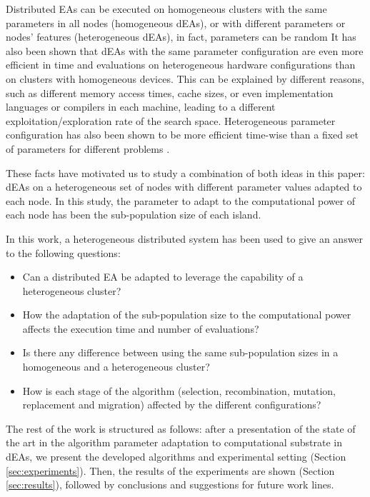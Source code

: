 \documentclass[final,1p,times]{elsarticle}
\begin{document}
Distributed EAs can be executed on homogeneous clusters with the same
parameters in all nodes (homogeneous dEAs), or with different
parameters or nodes' features (heterogeneous dEAs), in fact,
parameters can be random \cite{garcia2014randomized,tanabe2013evaluation}
It  has also been shown \cite{HETEROGENEOUSHARD} that dEAs with the same parameter configuration are even
more efficient in time and evaluations on heterogeneous hardware configurations than on clusters with
homogeneous devices. This can be explained by different reasons, such
as different memory access times, cache sizes, 
or even implementation
languages or compilers in each machine, leading to a different
exploitation/exploration rate of the search space. 
Heterogeneous parameter
configuration  has also been shown to be more  efficient time-wise than a fixed
set 
of parameters for different problems
\cite{HETEROGENEOUSPARAMETERS}.  %


These facts have motivated us to study a combination of both ideas in
this paper: dEAs on a heterogeneous set of nodes with different
parameter values adapted to each node. In this study, the parameter to
adapt to the computational power of each node has been the
sub-population size of each island. %


In this work, a heterogeneous distributed system has been used to give an answer to the following questions:
\begin{itemize}
 \item Can a distributed EA be adapted to leverage the capability of a
   heterogeneous cluster? 
 \item How the adaptation of the sub-population size to the computational power affects the execution time and number of evaluations?
 \item Is there any difference between using the same sub-population sizes in a homogeneous and a heterogeneous cluster?
 \item How is each stage of the algorithm (selection, recombination, mutation, replacement and migration) affected by the different
   configurations?
\end{itemize}


The rest of the work is structured as follows: after a presentation of
the state of
the art in the algorithm parameter adaptation to computational substrate in dEAs, 
 we present the developed algorithms and experimental setting (Section \ref{sec:experiments}). 
Then, the results of the experiments are shown (Section \ref{sec:results}), followed by conclusions and suggestions for future work lines.
\end{document}
